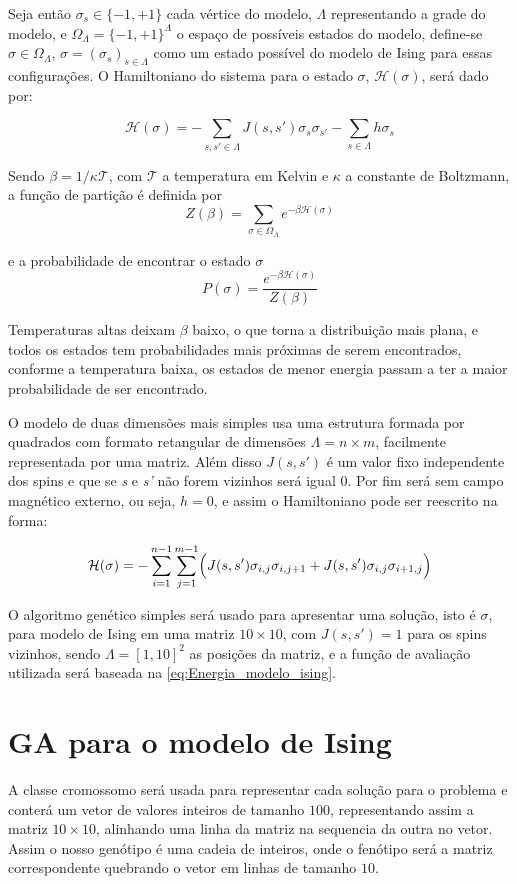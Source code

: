 Seja então \( \sigma_s \in \{ -1, +1 \} \) cada vértice do modelo, \(\Lambda\) representando a grade do modelo, e \(\Omega_{\Lambda} = \{-1, +1 \} ^ {\Lambda} \) o espaço de possíveis estados do modelo, define-se \(\sigma \in  \Omega_{\Lambda}\), \( \sigma = (\sigma_s)_{s \in \Lambda} \) como um estado possível do modelo de Ising para essas configurações. O Hamiltoniano do sistema para o estado \(\sigma\), \(\mathcal{H}(\sigma)\), será dado por: 

\[ \mathcal{H}(\sigma) = -\sum_{s,s' \in \Lambda}J(s,s')\sigma_{s}\sigma_{s'} -\sum_{s \in \Lambda}h \sigma_s \]

Sendo \(\beta = 1/\kappa \mathcal{T}\), com \(\mathcal{T}\) a temperatura em Kelvin e \(\kappa \) a constante de Boltzmann, a função de partição é definida por
\[ Z(\beta) = \sum_{\sigma \in \Omega_{\Lambda}} e^{-\beta \mathcal{H}(\sigma)} \]

e a probabilidade de encontrar o estado \(\sigma \)
\[ P(\sigma) = \frac{e^{-\beta \mathcal{H}(\sigma)}}{Z(\beta)} \]

Temperaturas altas deixam \(\beta\) baixo, o que torna a distribuição mais plana, e todos os estados tem probabilidades mais próximas de serem encontrados, conforme a temperatura baixa, os estados de menor energia passam a ter a maior probabilidade de ser encontrado.

O modelo de duas dimensões mais simples usa uma estrutura formada por quadrados com formato retangular de dimensões \(\Lambda = n \times m\), facilmente representada por uma matriz. Além disso \(J(s, s')\) é um valor fixo independente dos spins e que se \textit{s} e \textit{s'} não forem vizinhos será igual 0. Por fim será sem campo magnético externo, ou seja, \(h = 0\), e assim o Hamiltoniano pode ser reescrito na forma:

\begin{equation}
\mathcal{H}(\sigma) = - \sum_{i = 1}^{n-1} \sum_{j = 1}^{m-1} \Bigl( J(s,s')\sigma_{i,j}\sigma_{i,j+1} + J(s,s')\sigma_{i,j}\sigma_{i+1,j} \Bigr)
\label{eq:Energia_modelo_ising}
\end{equation}

O algoritmo genético simples será usado para apresentar uma solução, isto é \(\sigma\), para modelo de Ising em uma matriz \(10 \times 10\), com \(J(s,s') = 1\) para os spins vizinhos, sendo \(\Lambda = \left[1,10\right]^2\) as posições da matriz, e a função de avaliação utilizada será baseada na \autoref{eq:Energia_modelo_ising}.

\section{GA para o modelo de Ising}
A classe cromossomo será usada para representar cada solução para o problema e conterá um vetor de valores inteiros de tamanho $100$, representando assim a matriz \( 10 \times 10 \), alinhando uma linha da matriz na sequencia da outra no vetor. Assim o nosso genótipo é uma cadeia de inteiros, onde o fenótipo será a matriz correspondente quebrando o vetor em linhas de tamanho $10$.

